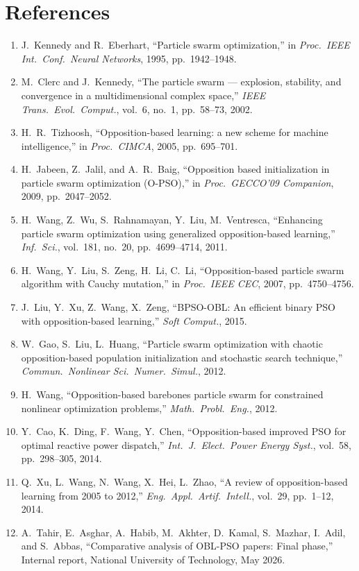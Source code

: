 \documentclass[11pt,a4paper]{article}
\begin{document}
\section*{References}
\begin{enumerate}[leftmargin=2em,itemsep=2pt]
\item J.\ Kennedy and R.\ Eberhart, ``Particle swarm optimization,''
      in \textit{Proc.\ IEEE Int.\ Conf.\ Neural Networks}, 1995,
      pp.~1942--1948.
\item M.\ Clerc and J.\ Kennedy, ``The particle swarm --- explosion,
      stability, and convergence in a multidimensional complex space,''
      \textit{IEEE Trans.\ Evol.\ Comput.}, vol.~6, no.~1, pp.~58--73, 2002.
\item H.\ R.\ Tizhoosh, ``Opposition-based learning: a new scheme for
      machine intelligence,'' in \textit{Proc.\ CIMCA}, 2005, pp.~695--701.
\item H.\ Jabeen, Z.\ Jalil, and A.\ R.\ Baig, ``Opposition based
      initialization in particle swarm optimization (O-PSO),'' in
      \textit{Proc.\ GECCO'09 Companion}, 2009, pp.~2047--2052.
\item H.\ Wang, Z.\ Wu, S.\ Rahnamayan, Y.\ Liu, M.\ Ventresca, ``Enhancing
      particle swarm optimization using generalized opposition-based learning,''
      \textit{Inf.\ Sci.}, vol.~181, no.~20, pp.~4699--4714, 2011.
\item H.\ Wang, Y.\ Liu, S.\ Zeng, H.\ Li, C.\ Li, ``Opposition-based particle
      swarm algorithm with Cauchy mutation,'' in \textit{Proc.\ IEEE CEC},
      2007, pp.~4750--4756.
\item J.\ Liu, Y.\ Xu, Z.\ Wang, X.\ Zeng, ``BPSO-OBL: An efficient binary
      PSO with opposition-based learning,'' \textit{Soft Comput.}, 2015.
\item W.\ Gao, S.\ Liu, L.\ Huang, ``Particle swarm optimization with chaotic
      opposition-based population initialization and stochastic search
      technique,'' \textit{Commun.\ Nonlinear Sci.\ Numer.\ Simul.}, 2012.
\item H.\ Wang, ``Opposition-based barebones particle swarm for constrained
      nonlinear optimization problems,'' \textit{Math.\ Probl.\ Eng.}, 2012.
\item Y.\ Cao, K.\ Ding, F.\ Wang, Y.\ Chen, ``Opposition-based improved PSO
      for optimal reactive power dispatch,'' \textit{Int.\ J.\ Elect.\ Power
      Energy Syst.}, vol.~58, pp.~298--305, 2014.
\item Q.\ Xu, L.\ Wang, N.\ Wang, X.\ Hei, L.\ Zhao, ``A review of
      opposition-based learning from 2005 to 2012,'' \textit{Eng.\ Appl.\
      Artif.\ Intell.}, vol.~29, pp.~1--12, 2014.
\item A.\ Tahir, E.\ Asghar, A.\ Habib, M.\ Akhter, D.\ Kamal, S.\ Mazhar,
      I.\ Adil, and S.\ Abbas, ``Comparative analysis of OBL-PSO papers:
      Final phase,'' Internal report, National University of Technology,
      May 2026.
\end{enumerate}
\end{document}
